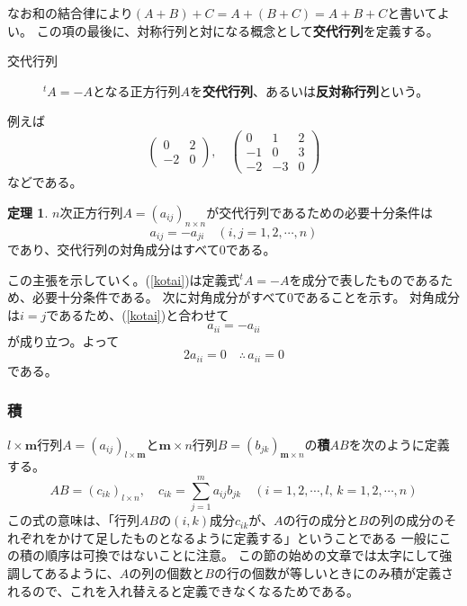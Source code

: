 \documentclass[10pt]{jsarticle}
\theoremstyle{definition}%
\newtheorem{thm}{定理}[section]%
\numberwithin{equation}{section}%
\begin{document}
なお和の結合律により$(A+B)+C=A+(B+C)=A+B+C$と書いてよい。
この項の最後に、対称行列と対になる概念として{\bf 交代行列}を定義する。
\begin{framed}
\begin{description}
  \item[交代行列] ${}^{t}A=-A$となる正方行列$A$を{\bf 交代行列}、あるいは{\bf 反対称行列}という。
\end{description}
\end{framed}
例えば
\begin{equation}
  \left(  
      \begin{matrix}
        0 & 2  \\
        -2 & 0
      \end{matrix}
    \right), \quad \left(  
      \begin{matrix}
        0 & 1 & 2\\
        -1 & 0 & 3\\
        -2& -3 & 0 
      \end{matrix}
    \right)
\end{equation}
などである。
\begin{screen}
  \begin{thm}
    $n$次正方行列$A=(a_{ij})_{n\times n}$が交代行列であるための必要十分条件は
    \begin{equation}
  \label{kotai}    a_{ij}=-a_{ji} \quad (i,j=1,2,\cdots ,n)
    \end{equation}
    であり、交代行列の対角成分はすべて0である。
  \end{thm}
\end{screen}
この主張を示していく。(\ref{kotai})は定義式${}^{t}A=-A$を成分で表したものであるため、必要十分条件である。
次に対角成分がすべて0であることを示す。
対角成分は$i=j$であるため、(\ref{kotai})と合わせて
\begin{equation}
  a_{ii}=-a_{ii}
\end{equation}
が成り立つ。よって
\begin{equation}
  2a_{ii}=0  \quad  \therefore \, a_{ii}=0
\end{equation}
である。
\subsubsection{積}
$l\times \bm{m}$行列$A=(a_{ij})_{l\times \bm{m}}$と$\bm{m}\times n$行列$B=(b_{jk})_{\bm{m}\times n}$の{\bf 積}$AB$を次のように定義する。
\begin{equation}
  AB=(c_{ik})_{l\times n},\quad c_{ik}=\sum_{j=1}^{m} a_{ij}b_{jk}\quad (i=1,2,\cdots ,l,\, k=1,2,\cdots , n)
\end{equation}
この式の意味は、「行列$AB$の$(i,k)$成分$c_{ik}$が、$A$の行の成分と$B$の列の成分のそれぞれをかけて足したものとなるように定義する」ということである
一般にこの積の順序は可換ではないことに注意。
この節の始めの文章では太字にして強調してあるように、$A$の列の個数と$B$の行の個数が等しいときにのみ積が定義されるので、これを入れ替えると定義できなくなるためである。
\end{document}

